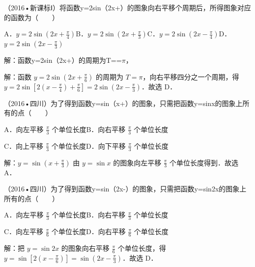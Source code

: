 \begin{question}
（2016•新课标Ⅰ）将函数y=2sin（2x+）的图象向右平移个周期后，所得图象对应的函数为（　　）\par
A．$y=2\sin(2x+\frac{\pi}{4})$\qquad B．$y=2\sin(2x+\frac{\pi}{3})$\qquad C．$y=2\sin(2x-\frac{\pi}{4})$\qquad D．$y=2\sin(2x-\frac{\pi}{3})$\par
\begin{solution}
解：函数y=2sin（2x+）的周期为T==\ensuremath{\pi}，\par
解：函数 $y=2\sin(2x+\frac{\pi}{6})$ 的周期为 $T=\pi$，向右平移四分之一个周期，得 $y=2\sin[2(x-\frac{\pi}{4})+\frac{\pi}{6}]=2\sin(2x-\frac{\pi}{3})$．故选 D．\par
\end{solution}
\end{question}

\begin{question}
（2016•四川）为了得到函数y=sin（x+）的图象，只需把函数y=sinx的图象上所有的点（　　）\par
A．向左平移 $\frac{\pi}{3}$ 个单位长度\qquad B．向右平移 $\frac{\pi}{3}$ 个单位长度\par
C．向上平移 $\frac{\pi}{3}$ 个单位长度\qquad D．向下平移 $\frac{\pi}{3}$ 个单位长度\par
\begin{solution}
解：$y=\sin(x+\frac{\pi}{3})$ 由 $y=\sin x$ 的图象向左平移 $\frac{\pi}{3}$ 个单位长度得到．故选 A．\par
\end{solution}
\end{question}

\begin{question}
（2016•四川）为了得到函数y=sin（2x-）的图象，只需把函数y=sin2x的图象上所有的点（　　）\par
A．向左平移 $\frac{\pi}{3}$ 个单位长度\qquad B．向右平移 $\frac{\pi}{3}$ 个单位长度\par
C．向左平移 $\frac{\pi}{6}$ 个单位长度\qquad D．向右平移 $\frac{\pi}{6}$ 个单位长度\par
\begin{solution}
解：把 $y=\sin 2x$ 的图象向右平移 $\frac{\pi}{6}$ 个单位长度，得 $y=\sin[2(x-\frac{\pi}{6})]=\sin(2x-\frac{\pi}{3})$．故选 D．\par
\end{solution}
\end{question}


